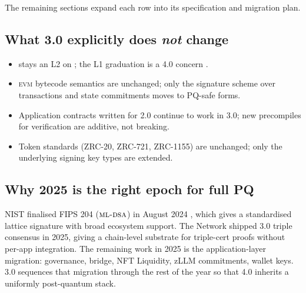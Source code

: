 The remaining sections expand each row into its specification and
migration plan.

\subsection{What 3.0 explicitly does \emph{not} change}

\begin{itemize}[leftmargin=1.2em]
  \item \Zoo{} stays an L2 on \Lux{}; the L1 graduation is a 4.0
        concern \cite{zoo-4-0}.
  \item \textsc{evm} bytecode semantics are unchanged; only the
        signature scheme over transactions and state commitments
        moves to PQ-safe forms.
  \item Application contracts written for 2.0 continue to work in 3.0;
        new precompiles for \Ringtail{} verification are additive,
        not breaking.
  \item Token standards (ZRC-20, ZRC-721, ZRC-1155) are unchanged; only
        the underlying signing key types are extended.
\end{itemize}

\subsection{Why 2025 is the right epoch for full PQ}

NIST finalised FIPS 204 ($\textsc{ml-dsa}{}$) in August 2024 \cite{nist-fips-204},
which gives \Zoo{} a standardised lattice signature with broad
ecosystem support. The \Lux{} Network shipped \Quasar{} 3.0 triple
consensus \cite{lp-020} in 2025, giving \Zoo{} a chain-level
substrate for triple-cert proofs without per-app integration. The
remaining work in 2025 is the application-layer migration: governance,
bridge, NFT Liquidity, zLLM commitments, wallet keys. \Zoo{} 3.0
sequences that migration through the rest of the year so that 4.0
inherits a uniformly post-quantum stack.
